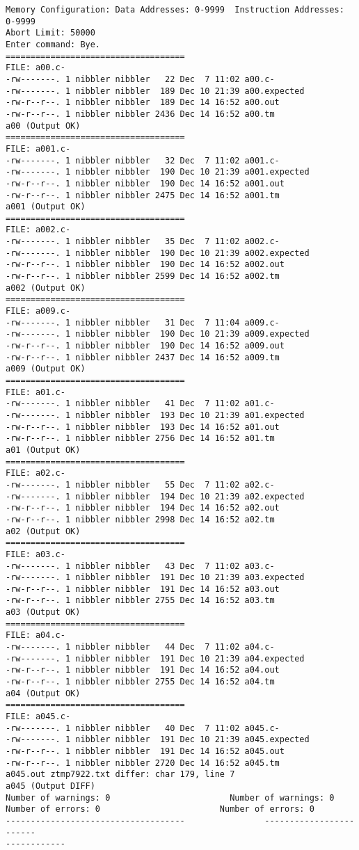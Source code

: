 \documentclass[12pt]{book}
\begin{document}
\begin{lstlisting}
Memory Configuration: Data Addresses: 0-9999  Instruction Addresses: 0-9999
Abort Limit: 50000
Enter command: Bye.
====================================
FILE: a00.c-
-rw-------. 1 nibbler nibbler   22 Dec  7 11:02 a00.c-
-rw-------. 1 nibbler nibbler  189 Dec 10 21:39 a00.expected
-rw-r--r--. 1 nibbler nibbler  189 Dec 14 16:52 a00.out
-rw-r--r--. 1 nibbler nibbler 2436 Dec 14 16:52 a00.tm
a00 (Output OK)
====================================
FILE: a001.c-
-rw-------. 1 nibbler nibbler   32 Dec  7 11:02 a001.c-
-rw-------. 1 nibbler nibbler  190 Dec 10 21:39 a001.expected
-rw-r--r--. 1 nibbler nibbler  190 Dec 14 16:52 a001.out
-rw-r--r--. 1 nibbler nibbler 2475 Dec 14 16:52 a001.tm
a001 (Output OK)
====================================
FILE: a002.c-
-rw-------. 1 nibbler nibbler   35 Dec  7 11:02 a002.c-
-rw-------. 1 nibbler nibbler  190 Dec 10 21:39 a002.expected
-rw-r--r--. 1 nibbler nibbler  190 Dec 14 16:52 a002.out
-rw-r--r--. 1 nibbler nibbler 2599 Dec 14 16:52 a002.tm
a002 (Output OK)
====================================
FILE: a009.c-
-rw-------. 1 nibbler nibbler   31 Dec  7 11:04 a009.c-
-rw-------. 1 nibbler nibbler  190 Dec 10 21:39 a009.expected
-rw-r--r--. 1 nibbler nibbler  190 Dec 14 16:52 a009.out
-rw-r--r--. 1 nibbler nibbler 2437 Dec 14 16:52 a009.tm
a009 (Output OK)
====================================
FILE: a01.c-
-rw-------. 1 nibbler nibbler   41 Dec  7 11:02 a01.c-
-rw-------. 1 nibbler nibbler  193 Dec 10 21:39 a01.expected
-rw-r--r--. 1 nibbler nibbler  193 Dec 14 16:52 a01.out
-rw-r--r--. 1 nibbler nibbler 2756 Dec 14 16:52 a01.tm
a01 (Output OK)
====================================
FILE: a02.c-
-rw-------. 1 nibbler nibbler   55 Dec  7 11:02 a02.c-
-rw-------. 1 nibbler nibbler  194 Dec 10 21:39 a02.expected
-rw-r--r--. 1 nibbler nibbler  194 Dec 14 16:52 a02.out
-rw-r--r--. 1 nibbler nibbler 2998 Dec 14 16:52 a02.tm
a02 (Output OK)
====================================
FILE: a03.c-
-rw-------. 1 nibbler nibbler   43 Dec  7 11:02 a03.c-
-rw-------. 1 nibbler nibbler  191 Dec 10 21:39 a03.expected
-rw-r--r--. 1 nibbler nibbler  191 Dec 14 16:52 a03.out
-rw-r--r--. 1 nibbler nibbler 2755 Dec 14 16:52 a03.tm
a03 (Output OK)
====================================
FILE: a04.c-
-rw-------. 1 nibbler nibbler   44 Dec  7 11:02 a04.c-
-rw-------. 1 nibbler nibbler  191 Dec 10 21:39 a04.expected
-rw-r--r--. 1 nibbler nibbler  191 Dec 14 16:52 a04.out
-rw-r--r--. 1 nibbler nibbler 2755 Dec 14 16:52 a04.tm
a04 (Output OK)
====================================
FILE: a045.c-
-rw-------. 1 nibbler nibbler   40 Dec  7 11:02 a045.c-
-rw-------. 1 nibbler nibbler  191 Dec 10 21:39 a045.expected
-rw-r--r--. 1 nibbler nibbler  191 Dec 14 16:52 a045.out
-rw-r--r--. 1 nibbler nibbler 2720 Dec 14 16:52 a045.tm
a045.out ztmp7922.txt differ: char 179, line 7
a045 (Output DIFF)
Number of warnings: 0                        Number of warnings: 0
Number of errors: 0                        Number of errors: 0
------------------------------------                ------------------------
------------


\end{lstlisting}
\end{document}
